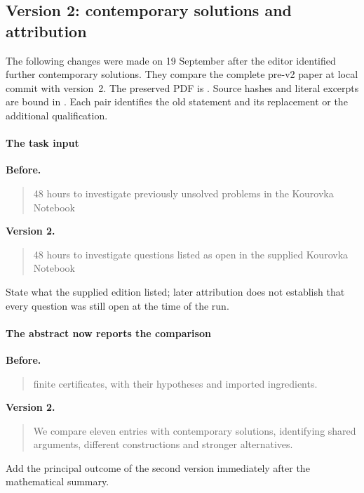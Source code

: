 \subsection{Version 2: contemporary solutions and attribution}
\label{sec:v2-changes}
The following changes were made on 19 September after the editor
identified further contemporary solutions. They compare the complete
pre-v2 paper at local commit  with version~2.
The preserved PDF is
.
Source hashes and literal excerpts are bound in
. Each pair identifies the old
statement and its replacement or the additional qualification.

\paragraph{The task input}

\noindent\textbf{Before.}
\begin{quote}\small
48 hours to investigate previously unsolved problems in the Kourovka
Notebook
\end{quote}

\noindent\textbf{Version 2.}
\begin{quote}\small
48 hours to investigate questions listed as open in the supplied Kourovka
Notebook
\end{quote}

State what the supplied edition listed; later attribution does not establish that every question was still open at the time of the run.

\paragraph{The abstract now reports the comparison}

\noindent\textbf{Before.}
\begin{quote}\small
finite certificates, with their hypotheses and imported ingredients.
\end{quote}

\noindent\textbf{Version 2.}
\begin{quote}\small
We compare eleven entries with contemporary solutions, identifying shared
arguments, different constructions and stronger alternatives.
\end{quote}

Add the principal outcome of the second version immediately after the mathematical summary.

